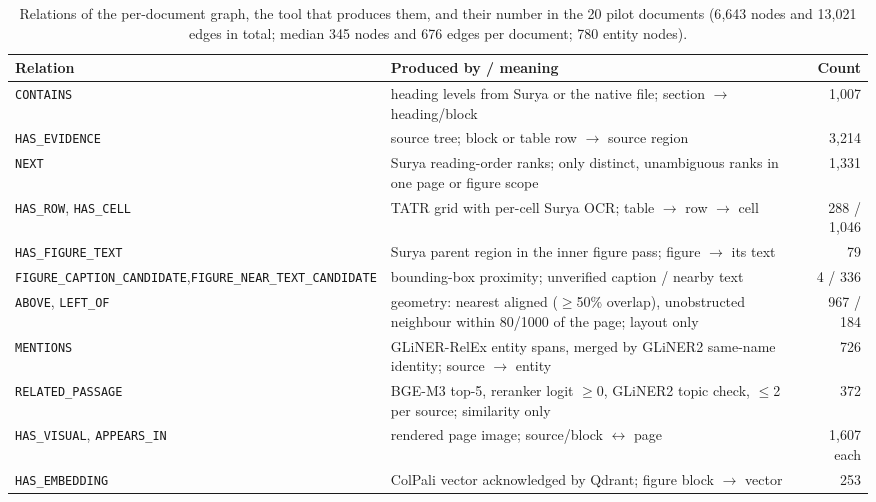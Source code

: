 \documentclass[runningheads]{llncs}
\begin{document}
\begin{table}[!htbp]
\centering\scriptsize
\caption{Relations of the per-document graph, the tool that produces them, and their number in the 20 pilot documents (6{,}643 nodes and 13{,}021 edges in total; median 345 nodes and 676 edges per document; 780 entity nodes).}
\label{tab:graph}
\setlength{\tabcolsep}{3pt}
\begin{tabular}{@{}p{}p{}r@{}}
\toprule
Relation & Produced by / meaning & Count \\
\midrule
\texttt{CONTAINS} & heading levels from Surya or the native file; section $\rightarrow$ heading/block & 1{,}007 \\
\texttt{HAS\_EVIDENCE} & source tree; block or table row $\rightarrow$ source region & 3{,}214 \\
\texttt{NEXT} & Surya reading-order ranks; only distinct, unambiguous ranks in one page or figure scope & 1{,}331 \\
\texttt{HAS\_ROW}, \texttt{HAS\_CELL} & TATR grid with per-cell Surya OCR; table $\rightarrow$ row $\rightarrow$ cell & 288 / 1{,}046 \\
\texttt{HAS\_FIGURE\_TEXT} & Surya parent region in the inner figure pass; figure $\rightarrow$ its text & 79 \\
\texttt{FIGURE\_CAPTION\_CANDIDATE},\newline \texttt{FIGURE\_NEAR\_TEXT\_CANDIDATE} & bounding-box proximity; unverified caption / nearby text & 4 / 336 \\
\texttt{ABOVE}, \texttt{LEFT\_OF} & geometry: nearest aligned ($\geq$50\% overlap), unobstructed neighbour within 80/1000 of the page; layout only & 967 / 184 \\
\texttt{MENTIONS} & GLiNER-RelEx entity spans, merged by GLiNER2 same-name identity; source $\rightarrow$ entity & 726 \\
\texttt{RELATED\_PASSAGE} & BGE-M3 top-5, reranker logit $\geq 0$, GLiNER2 topic check, $\leq$2 per source; similarity only & 372 \\
\texttt{HAS\_VISUAL}, \texttt{APPEARS\_IN} & rendered page image; source/block $\leftrightarrow$ page & 1{,}607 each \\
\texttt{HAS\_EMBEDDING} & ColPali vector acknowledged by Qdrant; figure block $\rightarrow$ vector & 253 \\
\bottomrule
\end{tabular}
\end{table}
\end{document}

